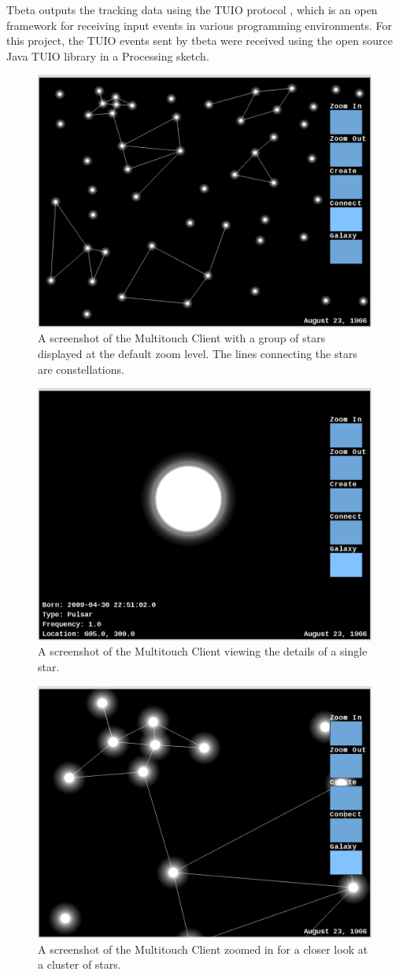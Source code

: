 Tbeta outputs the tracking data using the TUIO protocol \cite{TUIO}, which is an open framework for receiving input events in various programming environments. For this project, the TUIO events sent by tbeta were received using the open source Java TUIO library in a Processing sketch. 
\begin{figure}[htp]\centering
  \includegraphics[width=.8\textwidth]{images/Screenshot-MultitouchClient.png}
  \caption{A screenshot of the Multitouch Client with a group of stars displayed at the default zoom level. The lines connecting the stars are constellations.}\label{fig:mtdiagram}
\end{figure}
\begin{figure}[htp]\centering
  \includegraphics[width=.8\textwidth]{images/Screenshot-MultitouchClient-1.png}
  \caption{A screenshot of the Multitouch Client viewing the details of a single star.}\label{fig:mtdiagram-1}
\end{figure}
\begin{figure}[htp]\centering
  \includegraphics[width=.8\textwidth]{images/Screenshot-MultitouchClient-2.png}
  \caption{A screenshot of the Multitouch Client zoomed in for a closer look at a cluster of stars.}\label{fig:mtdiagram-2}
\end{figure}
\clearpage
